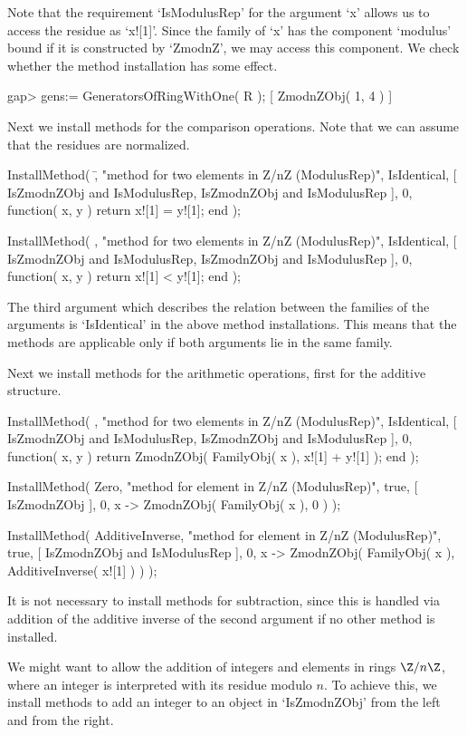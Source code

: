 Note that the requirement `IsModulusRep' for the argument `x' allows us
to access the residue as `x![1]'.
Since the family of `x' has the component `modulus' bound if it is
constructed by `ZmodnZ', we may access this component.
We check whether the method installation has some effect.

\begintt
    gap> gens:= GeneratorsOfRingWithOne( R );
    [ ZmodnZObj( 1, 4 ) ]
\endtt

Next we install methods for the comparison operations.
Note that we can assume that the residues are normalized.

\begintt
    InstallMethod( \=,
        "method for two elements in Z/nZ (ModulusRep)",
        IsIdentical,
        [ IsZmodnZObj and IsModulusRep, IsZmodnZObj and IsModulusRep ],
        0,
        function( x, y ) return x![1] = y![1]; end );

    InstallMethod( \<,
        "method for two elements in Z/nZ (ModulusRep)",
        IsIdentical,
        [ IsZmodnZObj and IsModulusRep, IsZmodnZObj and IsModulusRep ],
        0,
        function( x, y ) return x![1] < y![1]; end );
\endtt

The third argument which describes the relation between the families of
the arguments is `IsIdentical' in the above method installations.
This means that the methods are applicable only if both arguments lie in
the same family.

Next we install methods for the arithmetic operations,
first for the additive structure.

\begintt
    InstallMethod( \+,
        "method for two elements in Z/nZ (ModulusRep)",
        IsIdentical,
        [ IsZmodnZObj and IsModulusRep, IsZmodnZObj and IsModulusRep ],
        0,
        function( x, y )
        return ZmodnZObj( FamilyObj( x ), x![1] + y![1] );
        end );

    InstallMethod( Zero,
        "method for element in Z/nZ (ModulusRep)",
        true,
        [ IsZmodnZObj ], 0,
        x -> ZmodnZObj( FamilyObj( x ), 0 ) );

    InstallMethod( AdditiveInverse,
        "method for element in Z/nZ (ModulusRep)",
        true,
        [ IsZmodnZObj and IsModulusRep ], 0,
        x -> ZmodnZObj( FamilyObj( x ), AdditiveInverse( x![1] ) ) );
\endtt

It is not necessary to install methods for subtraction,
since this is handled via addition of the additive inverse of
the second argument if no other method is installed.

We might want to allow the addition of integers and elements in
rings $\Z/n\Z$, where an integer is interpreted with its residue modulo
$n$.
To achieve this, we install methods to add an integer to an object in
`IsZmodnZObj' from the left and from the right.

